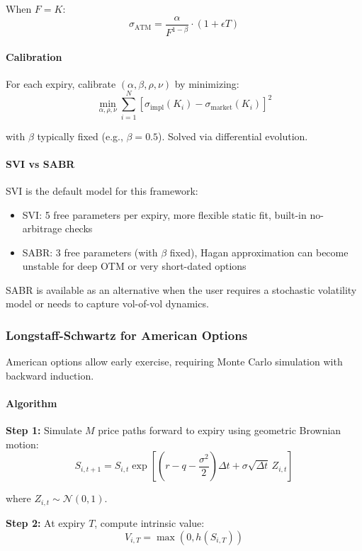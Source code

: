 When $F = K$:
\[
\sigma_{\text{ATM}} = \frac{\alpha}{F^{1-\beta}} \cdot \left(1 + \epsilon T\right)
\]

\paragraph{Calibration}

For each expiry, calibrate $(\alpha, \beta, \rho, \nu)$ by minimizing:
\[
\min_{\alpha, \rho, \nu} \sum_{i=1}^{N} \left[ \sigma_{\text{impl}}(K_i) - \sigma_{\text{market}}(K_i) \right]^2
\]

with $\beta$ typically fixed (e.g., $\beta = 0.5$). Solved via differential evolution.

\paragraph{SVI vs SABR}

SVI is the default model for this framework:
\begin{itemize}
  \item SVI: 5 free parameters per expiry, more flexible static fit, built-in no-arbitrage checks
  \item SABR: 3 free parameters (with $\beta$ fixed), Hagan approximation can become unstable for deep OTM or very short-dated options
\end{itemize}

SABR is available as an alternative when the user requires a stochastic volatility model or needs to capture vol-of-vol dynamics.

\subsubsection{Longstaff-Schwartz for American Options}

American options allow early exercise, requiring Monte Carlo simulation with backward induction.

\paragraph{Algorithm}

\textbf{Step 1:} Simulate $M$ price paths forward to expiry using geometric Brownian motion:
\[
S_{i,t+1} = S_{i,t} \exp\left[ \left(r - q - \frac{\sigma^2}{2}\right) \Delta t + \sigma \sqrt{\Delta t} \, Z_{i,t} \right]
\]

where $Z_{i,t} \sim \mathcal{N}(0, 1)$.

\textbf{Step 2:} At expiry $T$, compute intrinsic value:
\[
V_{i,T} = \max(0, h(S_{i,T}))
\]

